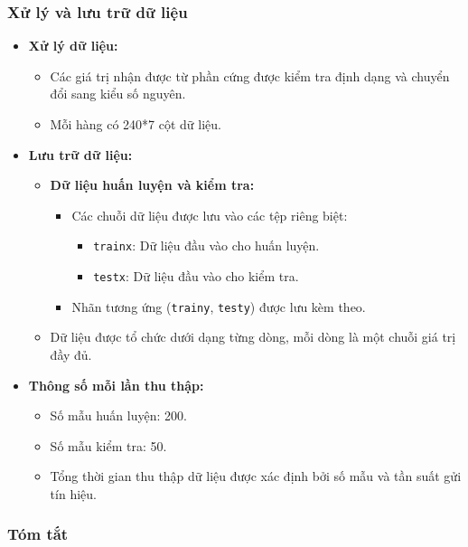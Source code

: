 \subsubsection{Xử lý và lưu trữ dữ liệu}

\begin{itemize}
    \item \textbf{Xử lý dữ liệu:}
    \begin{itemize}
        \item Các giá trị nhận được từ phần cứng được kiểm tra định dạng và chuyển đổi sang kiểu số nguyên.
        \item Mỗi hàng có 240*7 cột dữ liệu.
    \end{itemize}

    \item \textbf{Lưu trữ dữ liệu:}
    \begin{itemize}
        \item \textbf{Dữ liệu huấn luyện và kiểm tra:}
        \begin{itemize}
            \item Các chuỗi dữ liệu được lưu vào các tệp riêng biệt:
            \begin{itemize}
                \item \texttt{trainx}: Dữ liệu đầu vào cho huấn luyện.
                \item \texttt{testx}: Dữ liệu đầu vào cho kiểm tra.
            \end{itemize}
            \item Nhãn tương ứng (\texttt{trainy}, \texttt{testy}) được lưu kèm theo.
        \end{itemize}
        \item Dữ liệu được tổ chức dưới dạng từng dòng, mỗi dòng là một chuỗi giá trị đầy đủ.
    \end{itemize}

    \item \textbf{Thông số mỗi lần thu thập:}
    \begin{itemize}
        \item Số mẫu huấn luyện: 200.
        \item Số mẫu kiểm tra: 50.
        \item Tổng thời gian thu thập dữ liệu được xác định bởi số mẫu và tần suất gửi tín hiệu.
    \end{itemize}
\end{itemize}

\subsubsection{Tóm tắt}

